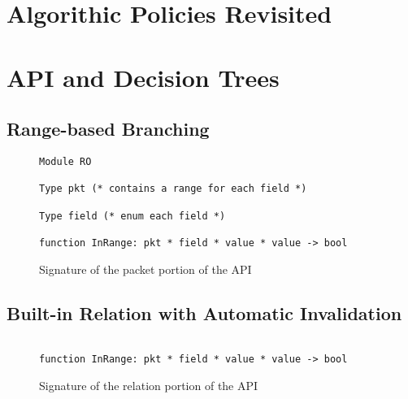 \documentclass[12pt]{article}
\begin{document}
\section*{Algorithic Policies Revisited}


\section*{API and Decision Trees}
   \subsection*{Range-based Branching}

   \begin{figure}
\begin{lstlisting}
Module RO

Type pkt (* contains a range for each field *)

Type field (* enum each field *)

function InRange: pkt * field * value * value -> bool

\end{lstlisting}

\caption{Signature of the packet portion of the API}
\end{figure}

   
   
   
   \subsection*{Built-in Relation with Automatic Invalidation}

   \begin{figure}
     \begin{lstlisting}
       
function InRange: pkt * field * value * value -> bool

\end{lstlisting}

\caption{Signature of the relation portion of the API}
\end{figure}
\end{document}
